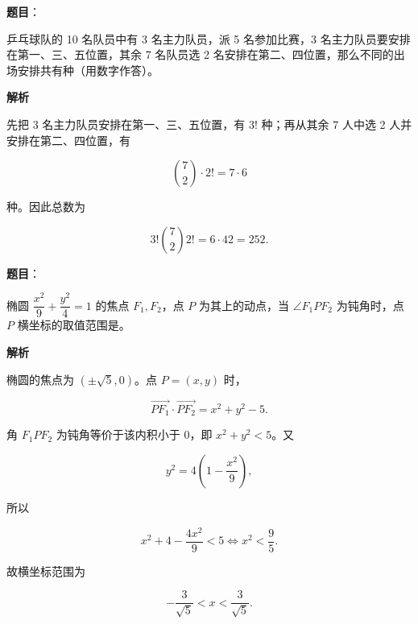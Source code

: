 \begin{answer}

\textbf{题目}：

乒乓球队的 10 名队员中有 3 名主力队员，派 5 名参加比赛，3 名主力队员要安排在第一、三、五位置，其余 7 名队员选 2 名安排在第二、四位置，那么不同的出场安排共有\gkblank{}种（用数字作答）。

\textbf{解析}

先把 3 名主力队员安排在第一、三、五位置，有 $3!$ 种；再从其余 7 人中选 2 人并安排在第二、四位置，有

\nopagebreak[4]
\[
\binom72\cdot2!=7\cdot6
\]

种。因此总数为

\nopagebreak[4]
\[
3!\binom72 2!=6\cdot42=252.
\]


\end{answer}
\begin{answer}

\textbf{题目}：

椭圆 $\dfrac{x^2}{9}+\dfrac{y^2}{4}=1$ 的焦点 $F_1,F_2$，点 $P$ 为其上的动点，当 $\angle F_1PF_2$ 为钝角时，点 $P$ 横坐标的取值范围是\gkblank{}。

\textbf{解析}

椭圆的焦点为 $(\pm\sqrt5,0)$。点 $P=(x,y)$ 时，

\nopagebreak[4]
\[
\overrightarrow{PF_1}\cdot\overrightarrow{PF_2}=x^2+y^2-5.
\]

角 $F_1PF_2$ 为钝角等价于该内积小于 $0$，即 $x^2+y^2<5$。又

\nopagebreak[4]
\[
y^2=4\left(1-\frac{x^2}{9}\right),
\]

所以

\nopagebreak[4]
\[
x^2+4-\frac{4x^2}{9}<5
\Longleftrightarrow x^2<\frac95.
\]

故横坐标范围为

\nopagebreak[4]
\[
-\frac3{\sqrt5}<x<\frac3{\sqrt5}.
\]


\end{answer}
